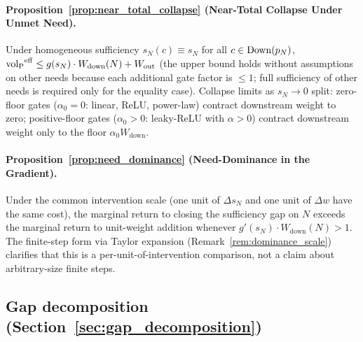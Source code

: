 \paragraph{Proposition~\ref{prop:near_total_collapse}
(Near-Total Collapse Under Unmet Need).}
Under homogeneous sufficiency $s_N(c) \equiv s_N$ for all $c
\in \mathrm{Down}(p_N)$,
${\operatorname{vol}_{\mathrm{P}}}^{\mathrm{eff}} \leq g(s_N) \cdot W_{\mathrm{down}}(N) +
W_{\mathrm{out}}$ (the upper bound holds without
assumptions on other needs because each additional gate factor
is $\leq 1$; full sufficiency of other needs is required only
for the equality case).  Collapse limits as $s_N \to 0$ split:
zero-floor gates ($\alpha_0 = 0$: linear, ReLU, power-law)
contract downstream weight to zero; positive-floor gates
($\alpha_0 > 0$: leaky-ReLU with $\alpha > 0$) contract
downstream weight only to the floor $\alpha_0
W_{\mathrm{down}}$.

\paragraph{Proposition~\ref{prop:need_dominance}
(Need-Dominance in the Gradient).}
Under the common intervention scale (one unit of $\Delta s_N$
and one unit of $\Delta w$ have the same cost), the marginal
return to closing the sufficiency gap on $N$ exceeds the
marginal return to unit-weight addition whenever $g'(s_N) \cdot
W_{\mathrm{down}}(N) > 1$.  The finite-step form via Taylor
expansion (Remark~\ref{rem:dominance_scale}) clarifies that
this is a per-unit-of-intervention comparison, not a claim
about arbitrary-size finite steps.

\subsection{Gap decomposition
(Section~\ref{sec:gap_decomposition})}

